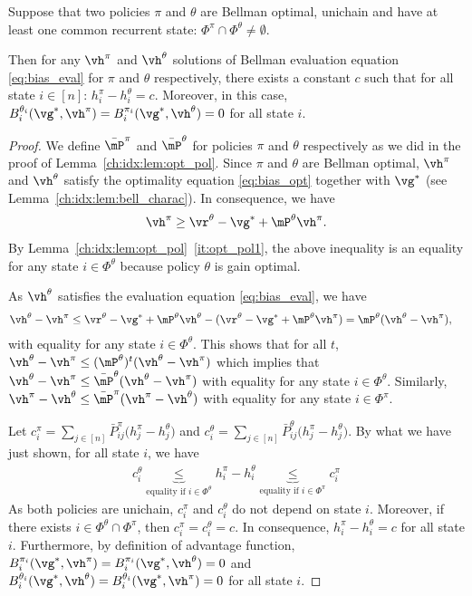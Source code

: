 \begin{lem}
    \label{ch:mbp:lem:equi_bias}
    Suppose that two policies $\pi$ and $\theta$ are Bellman optimal, unichain and have at least one common recurrent state: $\Phi^\pi\cap\Phi^\theta\neq\emptyset$.
    
    Then for any $\vh^\pi$ and $\vh^\theta$ solutions of Bellman evaluation equation \eqref{eq:bias_eval} for $\pi$ and $\theta$ respectively, there exists a constant $c$ such that for all state $i\in[n]$: $h^\pi_i -h^\theta_i =c$. Moreover, in this case, ${B_i^{\theta_i}(\vg^*, \vh^\pi)=B_i^{\pi_i}(\vg^*, \vh^\theta)=0}$ for all state $i$.
\end{lem}
\begin{proof}
    We define $\bar{\mP}^\pi$ and $\bar{\mP}^\theta$ for policies $\pi$ and $\theta$ respectively as we did in the proof of Lemma~\ref{ch:idx:lem:opt_pol}.
    Since $\pi$ and $\theta$ are Bellman optimal, $\vh^\pi$ and $\vh^\theta$ satisfy the optimality equation \eqref{eq:bias_opt} together with $\vg^*$ (see Lemma~\ref{ch:idx:lem:bell_charac}).
    In consequence, we have
    \begin{align*}
        \vh^\pi \ge \vr^\theta -\vg^* +\mP^\theta\vh^\pi.
    \end{align*}
    By Lemma~\ref{ch:idx:lem:opt_pol}~\ref{it:opt_pol1}, the above inequality is an equality for any state $i\in\Phi^\theta$ because policy $\theta$ is gain optimal.

    As $\vh^\theta$ satisfies the evaluation equation \eqref{eq:bias_eval}, we have
    \begin{align*}
        \vh^\theta -\vh^\pi &\le \vr^\theta -\vg^* +\mP^\theta\vh^\theta -(\vr^\theta -\vg^* +\mP^\theta\vh^\pi) = \mP^\theta(\vh^\theta -\vh^\pi),
    \end{align*}
    with equality for any state $i\in\Phi^\theta$.
    This shows that for all $t$, $\vh^\theta -\vh^\pi\le (\mP^\theta)^t(\vh^\theta -\vh^\pi)$ which implies that $\vh^\theta -\vh^\pi\le \bar{\mP}^\theta(\vh^\theta -\vh^\pi)$ with equality for any state $i\in\Phi^\theta$.
    Similarly, $\vh^\pi -\vh^\theta \le \bar{\mP}^\pi(\vh^\pi -\vh^\theta)$ with equality for any state $i\in\Phi^\pi$.

    Let $c^\pi_i=\sum_{j\in[n]}\bar{P}^\pi_{ij}\Big(h^\pi_j-h^\theta_j\Big)$ and $c^\theta_i=\sum_{j\in[n]}\bar{P}^\theta_{ij}\Big(h^\pi_j-h^\theta_j\Big)$.
    By what we have just shown, for all state $i$, we have
    \begin{align*}
        c^\theta_i \underbrace{\le}_{\text{equality if $i\in\Phi^\theta$}} h^\pi_i-h^\theta_i \underbrace{\le}_{\text{equality if $i\in\Phi^\pi$}} c^\pi_i
    \end{align*}
    As both policies are unichain, $c^\pi_i$ and $c^\theta_i$ do not depend on state $i$.
    Moreover, if there exists $i\in\Phi^\theta\cap\Phi^\pi$, then $c^\pi_i=c^\theta_i = c$. In consequence,  $h^\pi_i-h^\theta_i=c$ for all state $i$. 
    Furthermore, by definition of advantage function, $B_i^{\pi_i}(\vg^*, \vh^\pi)=B_i^{\pi_i}(\vg^*, \vh^\theta)=0$ and $B_i^{\theta_i}(\vg^*, \vh^\theta)=B_i^{\theta_i}(\vg^*, \vh^\pi)=0$ for all state $i$.
\end{proof}

